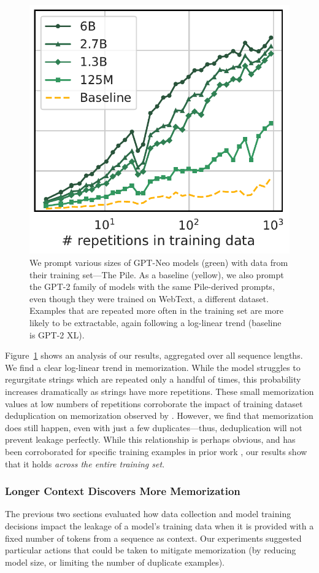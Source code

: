 \begin{figure}[ht]
        \includegraphics[height=0.4\textwidth]{figures/exactly_mem-vs-repetitions-mean-xlabel-markers.pdf} %
        \centering
        \caption{We prompt various sizes of GPT-Neo models (green) with data from their training set---The Pile. 
    As a baseline (yellow), we also prompt the GPT-2 family of models with the same Pile-derived prompts, even though they were trained on WebText, a different dataset.
    Examples that are repeated more often in the training set are more likely to be extractable,
    again following a log-linear trend (baseline is GPT-2 XL). 
    }
    \label{fig:main-res-dups}
\end{figure}

Figure~\ref{fig:main-res-dups} shows an analysis of our results, aggregated over all sequence lengths.
We find a clear log-linear trend in memorization. While the model struggles to regurgitate strings which are repeated only a handful of times, this probability increases dramatically as strings have more repetitions.
%
These small memorization values at low numbers of repetitions corroborate the impact of training dataset deduplication on memorization observed by \citet{lee2021deduplicating}.
%
However, we find that memorization does still happen, even with just a few duplicates---thus, deduplication will not  prevent leakage perfectly.
%
While this relationship is perhaps obvious, and has been corroborated for specific training examples in prior work \citep{carlini2019secret, carlini2020extracting}, our results show that it holds \emph{across the entire training set}.


\subsubsection{Longer Context Discovers More Memorization}
\label{sec:context}
The previous two sections evaluated how data collection and model training decisions impact the leakage of a model's training data when it is provided with a fixed number of tokens from a sequence as context.
Our experiments suggested particular actions that could be taken to mitigate memorization (by reducing model size, or limiting the number of duplicate examples).

